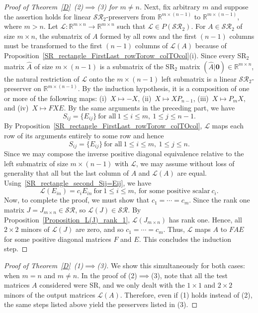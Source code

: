 \documentclass[11pt,reqno]{amsart}
\theoremstyle{plain}
\theoremstyle{definition}
\numberwithin{equation}{section}
\begin{document}
\begin{proof}[Proof of Theorem~\ref{D}~(2)$\implies$(3) for $m\neq n$]
	Next, fix arbitrary $m$ and suppose the assertion holds for linear $\mathcal{SR}_2$-preservers from $\mathbb{R}^{m\times (n-1)}$ to $\mathbb{R}^{m\times (n-1)}$, where $m>n$. Let $\mathcal{L}:\mathbb{R}^{m\times n}\to\mathbb{R}^{m\times n}$ such that $\mathcal{L}\in P(\mathcal{SR}_2)$. For $A\in \mathcal{SR}_2$ of size $m\times n$, the submatrix of $A$ formed by all rows and the first $(n-1)$ columns must be transformed to the first $(n-1)$ columns of $\mathcal{L}(A)$ because of Proposition~\ref{SR_rectangle_FirstLast_rowTorow_colTOcol}(i). Since every SR$_2$ matrix $\widehat{A}$ of size $m\times(n-1)$ is a submatrix of the SR$_2$ matrix $(\widehat{A}|\mathbf{0})\in\mathbb{R}^{m\times n}$, the natural restriction of $\mathcal{L}$ onto the $m\times(n-1)$ left submatrix is a linear $\mathcal{SR}_2$-preserver on $\mathbb{R}^{m\times(n-1)}$. By the induction hypothesis, it is a composition of one or more of the following maps: (i)~$X\mapsto -X$, (ii)~$X\mapsto XP_{n-1}$, (iii)~$X\mapsto P_mX$, and (iv)~$X\mapsto FXE$. By the same arguments in the preceding part, we have
	\[S_{ij}=\{E_{ij}\} ~\text{for all}~ 1\leq i\leq m,~ 1\leq j\leq n-1.\] 
	By Proposition~\ref{SR_rectangle_FirstLast_rowTorow_colTOcol}, $\mathcal{L}$ maps each row of its arguments entirely to some row and hence
	\begin{equation}\label{SR_rectangle_second_Sij=Eij}
		S_{ij}=\{E_{ij}\} ~\text{for all}~ 1\leq i\leq m,~ 1\leq j\leq n.
	\end{equation} 
	Since we may compose the inverse positive diagonal equivalence relative to the left submatrix of size $m\times(n-1)$ with $\mathcal{L}$, we may assume without loss of generality that all but the last column of $A$ and $\mathcal{L}(A)$ are equal. Using~\eqref{SR_rectangle_second_Sij=Eij}, we have
	\[\mathcal{L}(E_{in})=c_iE_{in}~\text{for}~ 1\leq i\leq m, ~\text{for some positive scalar} ~c_i.\]
	Now, to complete the proof, we must show that $c_1=\cdots=c_{m}$. Since the rank one matrix $J = J_{m \times n} \in \mathcal{SR}$, so $\mathcal{L}(J)\in \mathcal{SR}$. By Proposition~\ref{Proposition_L(J)_rank_1}, $\mathcal{L}(J_{m\times n})$ has rank one. Hence, all $2\times2$ minors of $\mathcal{L}(J)$ are zero, and so $c_1=\cdots=c_{m}$. Thus, $\mathcal{L}$ maps $A$ to $FAE$ for some positive diagonal matrices $F$ and $E$. This concludes the induction step.
\end{proof}
\begin{proof}[Proof of Theorem~\ref{D}~(1)$\implies$(3)]
We show this simultaneously for both cases: when $m=n$ and $m\neq n$. In the proof of (2)$\implies$(3), note that all the test matrices $A$ considered were SR, and we only dealt with the $1\times1$ and $2\times2$ minors of the output matrices $\mathcal{L}(A)$. Therefore, even if (1) holds instead of (2), the same steps listed above yield the preservers listed in (3).
\end{proof}
\end{document}
